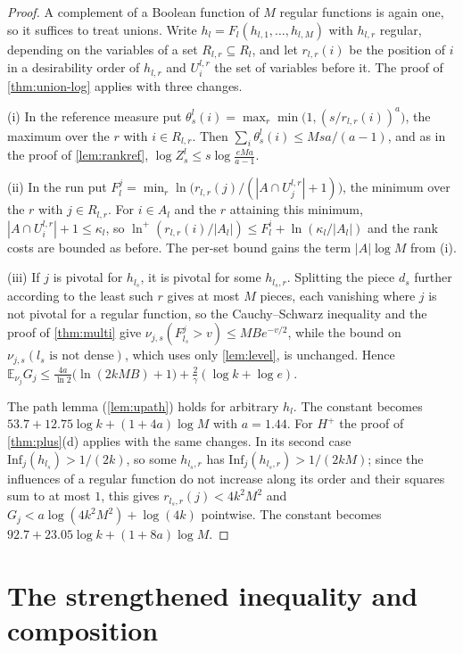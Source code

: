 \documentclass[11pt]{amsart}
\theoremstyle{definition}
\theoremstyle{remark}
\newcommand{\E}{\mathbb{E}}
\newcommand{\Inf}{\mathrm{Inf}}
\begin{document}
\begin{proof}
A complement of a Boolean function of $M$ regular functions is again one, so it suffices to treat unions. Write
$h_l=F_l(h_{l,1},\dots,h_{l,M})$ with $h_{l,r}$ regular, depending on the variables of a set $R_{l,r}\subseteq R_l$,
and let $r_{l,r}(i)$ be the position of $i$ in a desirability order of $h_{l,r}$ and $U^{l,r}_i$ the set of variables
before it. The proof of \cref{thm:union-log} applies with three changes.

(i) In the reference measure put $\theta^l_s(i)=\max_r\min\bigl(1,(s/r_{l,r}(i))^a\bigr)$, the maximum over the $r$
with $i\in R_{l,r}$. Then $\sum_i\theta^l_s(i)\le Msa/(a-1)$, and as in the proof of \cref{lem:rankref},
$\log Z^l_s\le s\log\frac{eMa}{a-1}$.

(ii) In the run put $F^j_l=\min_r\ln\bigl(r_{l,r}(j)/(|A\cap U^{l,r}_j|+1)\bigr)$, the minimum over the $r$ with
$j\in R_{l,r}$. For $i\in A_l$ and the $r$ attaining this minimum, $|A\cap U^{l,r}_i|+1\le\kappa_l$, so
$\ln^+(r_{l,r}(i)/|A_l|)\le F^i_l+\ln(\kappa_l/|A_l|)$ and the rank costs are bounded as before. The per-set bound
gains the term $|A|\log M$ from (i).

(iii) If $j$ is pivotal for $h_{l_s}$, it is pivotal for some $h_{l_s,r}$. Splitting the piece $d_s$ further
according to the least such $r$ gives at most $M$ pieces, each vanishing where $j$ is not pivotal for a regular
function, so the Cauchy--Schwarz inequality and the proof of \cref{thm:multi} give
$\nu_{j,s}(F^j_{l_s}>v)\le MBe^{-v/2}$, while the bound on $\nu_{j,s}(l_s\text{ is not dense})$, which uses only
\cref{lem:level}, is unchanged. Hence $\E_{\nu_j}G_j\le\frac{4a}{\ln2}\bigl(\ln(2kMB)+1\bigr)+\frac2\gamma(\log k+\log e)$.

The path lemma (\cref{lem:upath}) holds for arbitrary $h_l$. The constant becomes
$53.7+12.75\log k+(1+4a)\log M$ with $a=1.44$. For $H^+$ the proof of \cref{thm:plus}(d) applies with the same
changes. In its second case $\Inf_j(h_{l_s})>1/(2k)$, so some $h_{l_s,r}$ has $\Inf_j(h_{l_s,r})>1/(2kM)$; since the
influences of a regular function do not increase along its order and their squares sum to at most $1$, this gives
$r_{l_s,r}(j)<4k^2M^2$ and $G_j<a\log(4k^2M^2)+\log(4k)$ pointwise. The constant becomes
$92.7+23.05\log k+(1+8a)\log M$.
\end{proof}

\section{The strengthened inequality and composition}\label{sec:plus}
\end{document}
